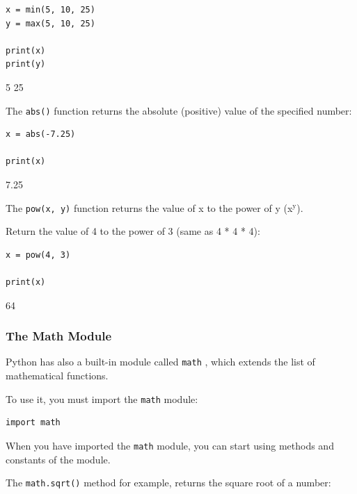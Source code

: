 \documentclass[12pt,a4paper]{article}
\newcommand{\code}[1]{%
	\colorbox{backcolour}{\lstinline{#1}}%
}
\begin{document}
\begin{ebox}
	\begin{lstlisting}
x = min(5, 10, 25)
y = max(5, 10, 25)

print(x)
print(y)
	\end{lstlisting}
\tcblower
	\begin{vercode}
5
25
	\end{vercode}
\end{ebox}

The \code{abs()} function returns the absolute (positive) value of the
specified number:

\begin{ebox}
	\begin{lstlisting}
x = abs(-7.25)

print(x)
	\end{lstlisting}
\tcblower
	\begin{vercode}
7.25
	\end{vercode}
\end{ebox}

The \code{pow(x, y)} function returns the value of x to the power of y
(x$\mathrm{^y}$).

\begin{ebox}
Return the value of 4 to the power of 3 (same as 4 * 4 * 4):
	\begin{lstlisting}
x = pow(4, 3)

print(x)
	\end{lstlisting}
\tcblower
	\begin{vercode}
64
	\end{vercode}
\end{ebox}
\subsubsection{The Math Module}

Python has also a built-in module called \code{math}, which extends the
list of mathematical functions.

To use it, you must import the \code{math} module:

\begin{lstlisting}
import math
\end{lstlisting}

When you have imported the \code{math} module, you can start using methods
and constants of the module.

The \code{math.sqrt()} method for example, returns the square root of a
number:
\end{document}
